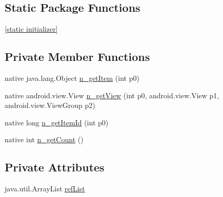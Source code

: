 \subsection*{Static Package Functions}
\begin{CompactItemize}
\item 
\hyperlink{classmd5b60ffeb829f638581ab2bb9b1a7f4f3f_1_1_navigation_menu_renderer___menu_adapter_abd9ff33c25492ee0ac23f2a4f8be7e0}{\mbox{[}static initializer\mbox{]}}
\end{CompactItemize}
\subsection*{Private Member Functions}
\begin{CompactItemize}
\item 
native java.lang.Object \hyperlink{classmd5b60ffeb829f638581ab2bb9b1a7f4f3f_1_1_navigation_menu_renderer___menu_adapter_cdf5437d44dbba53f13ac26a1a966d0b}{n\_\-getItem} (int p0)
\item 
native android.view.View \hyperlink{classmd5b60ffeb829f638581ab2bb9b1a7f4f3f_1_1_navigation_menu_renderer___menu_adapter_09dc2f9b7fa0c5d8875fb553e7b4ec3b}{n\_\-getView} (int p0, android.view.View p1, android.view.ViewGroup p2)
\item 
native long \hyperlink{classmd5b60ffeb829f638581ab2bb9b1a7f4f3f_1_1_navigation_menu_renderer___menu_adapter_b8f31e976ee1157cae0abf1c24e7f7c2}{n\_\-getItemId} (int p0)
\item 
native int \hyperlink{classmd5b60ffeb829f638581ab2bb9b1a7f4f3f_1_1_navigation_menu_renderer___menu_adapter_64491c97bb50745245d20353a99d088d}{n\_\-getCount} ()
\end{CompactItemize}
\subsection*{Private Attributes}
\begin{CompactItemize}
\item 
java.util.ArrayList \hyperlink{classmd5b60ffeb829f638581ab2bb9b1a7f4f3f_1_1_navigation_menu_renderer___menu_adapter_816f51fd01db11b07020f12e0694cf61}{refList}
\end{CompactItemize}


